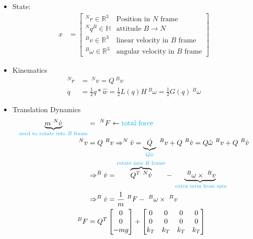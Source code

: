 \documentclass[11pt]{article}
\begin{document}
\begin{itemize}
    \item State:
    \begin{align*}
        x &=
        \begin{bmatrix}
            ^Nr \in \mathbb{R}^3 & \text{Position in } N \text{ frame} \\
            ^Nq^B \in \mathbb{H} & \text{attitude } B\rightarrow N \\
            ^Bv \in\mathbb{R}^3  &\text{linear velocity in } B \text{ frame} \\
            ^B\omega \in\mathbb{R}^3 & \text{angular velocity in } B \text{ frame}
        \end{bmatrix}
    \end{align*}

    \item Kinematics
    \begin{align*}
        ^N\dot{r} &= \ ^Nv = Q \ ^Bv \\
        \dot{q} &= \frac{1}{2}q*\hat{w} = \frac{1}{2}L(q)H \ ^B\omega = \frac{1}{2}G(q)\ ^B\omega
    \end{align*}
    \item Translation Dynamics 
    \begin{align*}
        \underbrace{m \ ^N\dot{v}}_{\textcolor{cyan}{\text{need to rotate into }B \text{ frame}}} &= \ ^NF \leftarrow \textcolor{cyan}{\text{total force}}
        \\
        ^Nv &= Q \ ^Bv \Rightarrow ^N\dot{v} = \underbrace{\dot{Q}}_{\textcolor{cyan}{Q\hat{\omega}}}\ ^Bv + Q\ ^B\dot{v} = Q\hat{\omega} \ ^Bv + Q \ ^B\dot{v} \\
        &\Rightarrow ^B\dot{v} = \overbrace{Q^T\ ^N\dot{v}}^{\textcolor{cyan}{\text{rotate into }B\text{ frame}}} - \underbrace{\ ^B\omega\times \ ^Bv}_ {\textcolor{cyan}{ \text{ extra term from spin}}} \\
        & \Rightarrow ^B\dot{v} = \frac{1}{m} \ ^BF - \ ^B\omega\times \ ^Bv \\
        ^BF &= Q^T\begin{bmatrix}
            0 \\
            0 \\
            -mg
        \end{bmatrix}
        +
        \begin{bmatrix}
            0 & 0 & 0 & 0 \\
            0 & 0 & 0 & 0 \\
            k_T & k_T & k_T & k_T

\end{bmatrix}
\end{align*}
\end{itemize}
\end{document}
